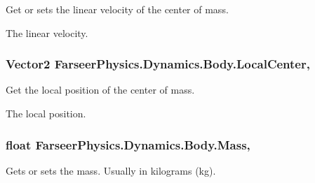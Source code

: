 Get or sets the linear velocity of the center of mass. 

The linear velocity.\hypertarget{class_farseer_physics_1_1_dynamics_1_1_body_a203f73f859e1a9fc0148fd55a839ec20}{
\subsubsection[{Local\+Center}]{\setlength{\rightskip}{0pt plus 5cm}Vector2 Farseer\+Physics.\+Dynamics.\+Body.\+Local\+Center\hspace{0.3cm}{\ttfamily [get]}, {\ttfamily [set]}}}\label{class_farseer_physics_1_1_dynamics_1_1_body_a203f73f859e1a9fc0148fd55a839ec20}


Get the local position of the center of mass. 

The local position.\hypertarget{class_farseer_physics_1_1_dynamics_1_1_body_a1856ecffe4c463466a6ff9ca1803f664}{
\subsubsection[{Mass}]{\setlength{\rightskip}{0pt plus 5cm}float Farseer\+Physics.\+Dynamics.\+Body.\+Mass\hspace{0.3cm}{\ttfamily [get]}, {\ttfamily [set]}}}\label{class_farseer_physics_1_1_dynamics_1_1_body_a1856ecffe4c463466a6ff9ca1803f664}


Gets or sets the mass. Usually in kilograms (kg). 

